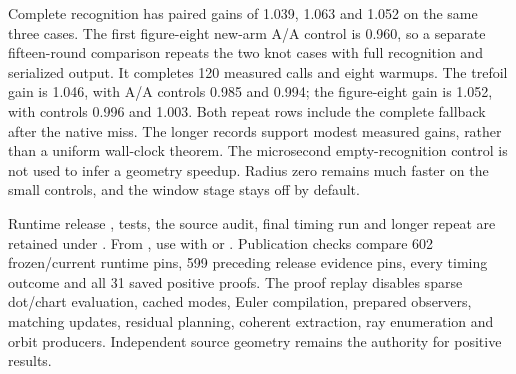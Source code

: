 Complete recognition has paired gains of 1.039, 1.063 and 1.052 on the
same three cases. The first figure-eight new-arm A/A control is 0.960,
so a separate fifteen-round comparison repeats the two knot cases with
full recognition and serialized output. It completes 120 measured calls
and eight warmups. The trefoil gain is 1.046, with A/A controls 0.985 and
0.994; the figure-eight gain is 1.052, with controls 0.996 and 1.003.
Both repeat rows include the complete fallback after the native miss.
The longer records support modest measured gains, rather than a uniform
wall-clock theorem. The microsecond empty-recognition control is not used
to infer a geometry speedup. Radius zero remains much faster on the small
controls, and the window stage stays off by default.

\begin{sloppypar}
Runtime release , tests, the source audit, final timing
run and longer repeat are retained under .
From , use  with
 or .
Publication checks compare 602 frozen/current runtime pins, 599 preceding
release evidence pins, every timing outcome and all 31 saved positive proofs.
The proof replay disables sparse dot/chart evaluation, cached modes,
Euler compilation, prepared observers, matching updates, residual planning,
coherent extraction, ray enumeration and orbit producers. Independent source
geometry remains the authority for positive results.
\end{sloppypar}
